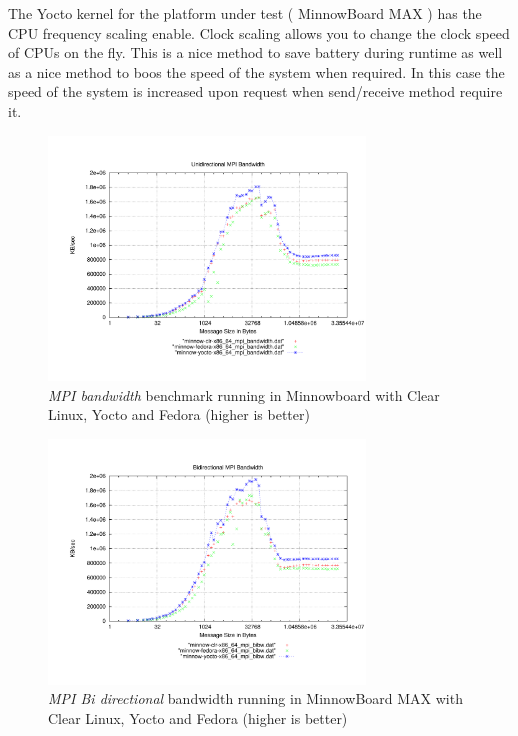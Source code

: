 The Yocto kernel for the platform under test ( MinnowBoard MAX ) has the CPU
frequency scaling enable. Clock scaling allows you to change the clock speed of
CPUs on the fly. This is a nice method to save battery during runtime as well
as a nice method to boos the speed of the system when required. In this case
the speed of the system is increased upon request when send/receive method
require it.

\begin{figure}[H]
\centering
\includegraphics[width=0.75\textwidth]{images/mpbench_yocto_experiments/mpi_bandwidth.pdf}
\caption{\textit{MPI bandwidth} benchmark running in Minnowboard with Clear Linux,
Yocto and Fedora (higher is better)}
\label{mpi_bandwidth_yocto}
\end{figure}


\begin{figure}[H]
\centering
\includegraphics[width=0.75\textwidth]{images/mpbench_yocto_experiments/mpi_bibw.pdf}
\caption{\textit{MPI Bi directional} bandwidth running in MinnowBoard MAX with Clear Linux,
Yocto and Fedora (higher is better)}
\label{mpi_bibw_yocto}
\end{figure}



